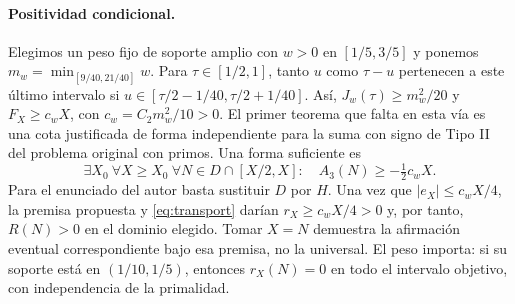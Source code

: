 \documentclass[11pt,a4paper]{article}
\newcommand{\B}[2]{#2}
\newcommand{\B}[2]{#1}
\begin{document}
\paragraph{\B{Conditional positivity.}{Positividad condicional.}}
\B{Choose one fixed broad weight $w>0$ on $[1/5,3/5]$ and put $m_w=\min_{[9/40,21/40]}w$. For $\tau\in[1/2,1]$, both $u$ and $\tau-u$ lie in this last interval when $u\in[\tau/2-1/40,\tau/2+1/40]$. Thus $J_w(\tau)\ge m_w^2/20$ and $F_X\ge c_w X$, with $c_w=C_2m_w^2/10>0$. The first missing theorem for this route is an independently justified bound on the signed Type II sum for the unchanged prime problem. One sufficient form is}{Elegimos un peso fijo de soporte amplio con $w>0$ en $[1/5,3/5]$ y ponemos $m_w=\min_{[9/40,21/40]}w$. Para $\tau\in[1/2,1]$, tanto $u$ como $\tau-u$ pertenecen a este último intervalo si $u\in[\tau/2-1/40,\tau/2+1/40]$. Así, $J_w(\tau)\ge m_w^2/20$ y $F_X\ge c_w X$, con $c_w=C_2m_w^2/10>0$. El primer teorema que falta en esta vía es una cota justificada de forma independiente para la suma con signo de Tipo II del problema original con primos. Una forma suficiente es}
\begin{equation}\label{eq:missing}
 \exists X_0\ \forall X\ge X_0\ \forall N\in D\cap[X/2,X]:
 \quad A_3(N)\ge-\tfrac12c_wX .
\end{equation}
\B{For the author’s statement alone replace $D$ by $H$. Once $|e_X|\le c_wX/4$, the proposed premise and \eqref{eq:transport} would give $r_X\ge c_wX/4>0$, hence $R(N)>0$ on the chosen domain. Taking $X=N$ proves the corresponding eventual assertion under this premise, not the universal assertion. The weight is important: if supported in $(1/10,1/5)$, then $r_X(N)=0$ on the entire target interval, regardless of primality.}{Para el enunciado del autor basta sustituir $D$ por $H$. Una vez que $|e_X|\le c_wX/4$, la premisa propuesta y \eqref{eq:transport} darían $r_X\ge c_wX/4>0$ y, por tanto, $R(N)>0$ en el dominio elegido. Tomar $X=N$ demuestra la afirmación eventual correspondiente bajo esa premisa, no la universal. El peso importa: si su soporte está en $(1/10,1/5)$, entonces $r_X(N)=0$ en todo el intervalo objetivo, con independencia de la primalidad.}
\end{document}
